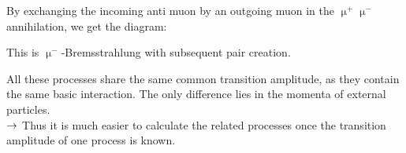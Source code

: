 By exchanging the incoming anti muon by an outgoing muon in the $\upmu^+\upmu^-$ annihilation, we get the diagram:
\begin{center}
\end{center}
This is $\upmu^-$-Bremsstrahlung with subsequent pair creation.

All these processes share the same common transition amplitude, as they contain the same basic interaction. The only difference lies in the momenta of external particles.\\
$\rightarrow$ Thus it is much easier to calculate the related processes once the transition amplitude of one process is known.

